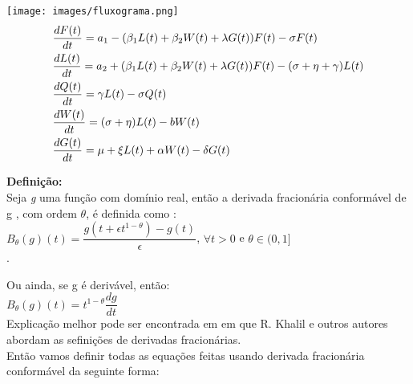 \documentclass[12pt,a4paper]{article}
\begin{document}
\texttt{[image: images/fluxograma.png]}
\begin{align}
    
    &\dfrac{dF(t)}{dt} = a_1 - (\beta_1 L(t) + \beta_2 W(t) + \lambda G(t)) F(t) - \sigma F(t) \vspace{2mm} \\
    
    &\dfrac{dL(t)}{dt} = a_2 + (\beta_1 L(t) + \beta_2 W(t) + \lambda G(t)) F(t) - (\sigma + \eta + \gamma) L(t)\vspace{2mm}\\
    
    &\dfrac{dQ(t)}{dt} = \gamma L(t) - \sigma Q(t)\vspace{2mm}\\
    
    &\dfrac{dW(t)}{dt} = (\sigma + \eta) L(t) - bW(t)\vspace{2mm}\\
    
    &\dfrac{dG(t)}{dt} = \mu + \xi L(t) + \alpha W(t) - \delta G(t)
\end{align}

\vspace{5mm}

\noindent \textbf{Definição:}\\
    Seja \textit{g} uma função com domínio real, então a derivada fracionária conformável de g , com ordem $\theta$, é definida como \vspace{2mm}:\\
    $B_\theta (g)(t) = \dfrac{g(t + \epsilon t^{1-\theta}) - g(t)}{\epsilon}$, $\forall t > 0$ e $\theta \in (0,1]$\\.
    
    \noindent Ou ainda, se g é derivável, então:\\
    $B_\theta (g)(t) = t^{1-\theta} \dfrac{dg}{dt}$\\
    
    \noindent Explicação melhor pode ser encontrada em \cite{R. Khalil} em que R. Khalil e outros autores abordam as sefinições de derivadas fracionárias.\\
    
    
    
    \vspace{3mm}
    \noindent Então vamos definir todas as equações feitas usando derivada fracionária conformável da seguinte forma:
    
\end{document}
